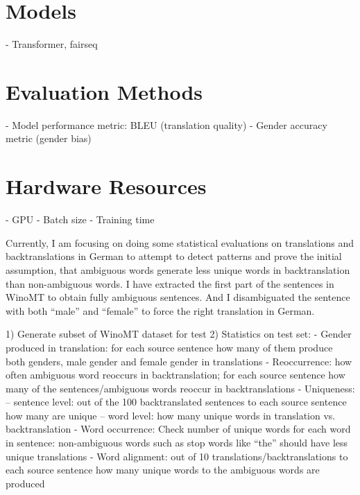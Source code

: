 \section{Models}
\label{sec:Experiments:Models}
- Transformer, fairseq

\section{Evaluation Methods}
\label{sec:Experiments:Evaluation}
- Model performance metric: BLEU (translation quality)
- Gender accuracy metric (gender bias)


\section{Hardware Resources}
\label{sec:Experiments:Hardware}
- GPU
- Batch size
- Training time


Currently, I am focusing on doing some statistical evaluations on translations and backtranslations in German to attempt to detect patterns and prove the initial assumption, that ambiguous words generate less unique words in backtranslation than non-ambiguous words. 
I have extracted the first part of the sentences in WinoMT to obtain fully ambiguous sentences. And I disambiguated the sentence with both “male” and “female” to force the right translation in German.

1) Generate subset of WinoMT dataset for test
2) Statistics on test set:
- Gender produced in translation: for each source sentence how many of them produce both genders, male gender and female gender in translations
- Reoccurrence: how often ambiguous word reoccurs in backtranslation; for each source sentence how many of the sentences/ambiguous words reoccur in backtranslations
- Uniqueness: 
-- sentence level: out of the 100 backtranslated sentences to each source sentence how many are unique
-- word level: how many unique words in translation vs. backtranslation
- Word occurrence: Check number of unique words for each word in sentence: non-ambiguous words such as stop words like “the” should have less unique translations 
- Word alignment: out of 10 translations/backtranslations to each source sentence how many unique words to the ambiguous words are produced

